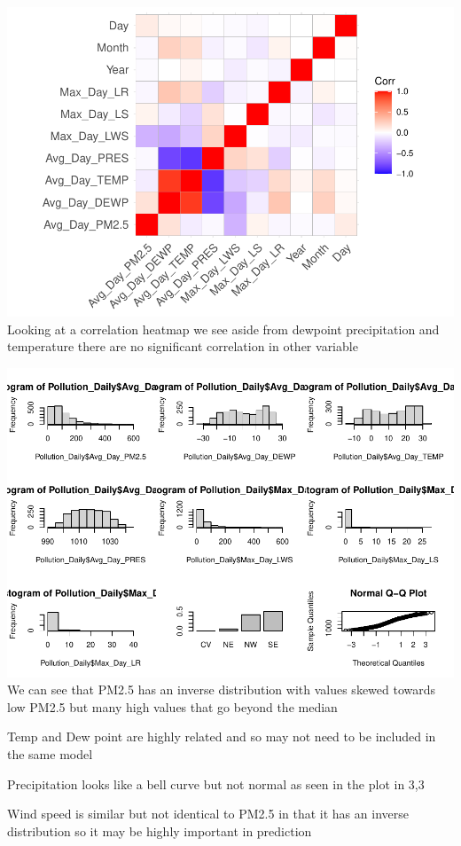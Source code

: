 \documentclass[
]{report}
\begin{document}
\includegraphics{Final_7_files/figure-latex/unnamed-chunk-3-1.pdf}
Looking at a correlation heatmap we see aside from dewpoint
precipitation and temperature there are no significant correlation in
other variable

\includegraphics{Final_7_files/figure-latex/unnamed-chunk-4-1.pdf} We
can see that PM2.5 has an inverse distribution with values skewed
towards low PM2.5 but many high values that go beyond the median

Temp and Dew point are highly related and so may not need to be included
in the same model

Precipitation looks like a bell curve but not normal as seen in the plot
in 3,3

Wind speed is similar but not identical to PM2.5 in that it has an
inverse distribution so it may be highly important in prediction
\end{document}
